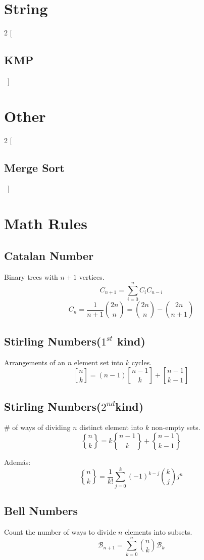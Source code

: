 \documentclass[a4paper]{amsart}
\newcommand{\includecpp}[3]{
\begin{multicols}{2}
    [\subsection{#1}\ ]
    
\end{multicols}
}
\newcommand{\stirlingfirst}[2]{\genfrac{[}{]}{0pt}{}{#1}{#2}}
\newcommand{\stirlingsecond}[2]{\genfrac{\{}{\}}{0pt}{}{#1}{#2}}
\begin{document}
\section{String}
\includecpp{KMP}{./String}{KMP.cpp}

\section{Other}
\includecpp{Merge Sort}{./Other}{Mergesort.cpp}

\section{Math Rules}
\subsection{Catalan Number}
Binary trees with $n+1$ vertices.
\begin{equation*}
    C_{n+1} = \sum_{i=0}^nC_iC_{n-i}
\end{equation*}
\begin{equation*}
    C_n = \frac{1}{n+1}\binom{2n}{n} = \binom{2n}{n} - \binom{2n}{n+1}
\end{equation*}
\subsection{Stirling Numbers($1^{st}$ kind)} Arrangements of an $n$ element set into $k$ cycles.
\begin{equation*}
    \stirlingfirst{n}{k} = (n-1)\stirlingfirst{n-1}{k} + \stirlingfirst{n-1}{k-1}
\end{equation*}

\subsection{Stirling Numbers($2^{nd}$kind)} \# of ways of dividing $n$ distinct element into $k$ non-empty sets.
\begin{equation*}
    \stirlingsecond{n}{k} = k\stirlingsecond{n-1}{k} + \stirlingsecond{n-1}{k-1}
\end{equation*}

Además:
\begin{equation*}
    \stirlingsecond{n}{k} = \frac{1}{k!}\sum_{j=0}^k (-1)^{k-j} \binom{k}{j} j^n
\end{equation*}

\subsection{Bell Numbers} Count the number of ways to divide $n$ elements into subsets.
\begin{equation*}
    \mathcal{B}_{n+1} = \sum_{k=0}^n \binom{n}{k} \mathcal{B}_k
\end{equation*}
\end{document}
